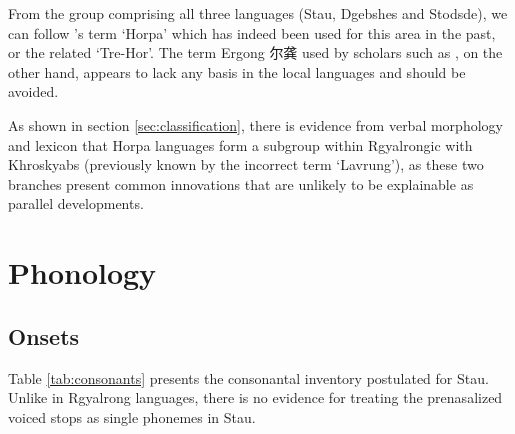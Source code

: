 \documentclass[oneside,a4paper,11pt]{article}
\newcommand{\zh}[1]{{\cn #1}}
\begin{document}
From the group comprising all three languages (Stau, Dgebshes and Stodsde),  we can follow 
\citet{jackson00sidaba}'s term `Horpa' which has indeed been used for this area in the past, or the related `Tre-Hor'.  The term Ergong \zh{尔龚} used by scholars such as \citet{sun83liujiang}, on the other hand, appears to lack any basis in the local languages and should be avoided.
 
As shown in section \ref{sec:classification}, there is evidence from verbal morphology and lexicon that Horpa languages form a subgroup within Rgyalrongic with Khroskyabs (previously known by the incorrect term `Lavrung'), as these two branches present common innovations that are unlikely to be explainable as parallel developments.
 
\section{Phonology}
 
 
  \subsection{Onsets}
  Table \ref{tab:consonants} presents the consonantal inventory postulated for Stau. Unlike in Rgyalrong languages, there is no evidence for treating the prenasalized voiced stops as single phonemes in Stau.
  
 \begin{table}
 \caption{Consonantal phonemes in Stau} \label{tab:consonants}  \centering
\end{table}
\end{document}
